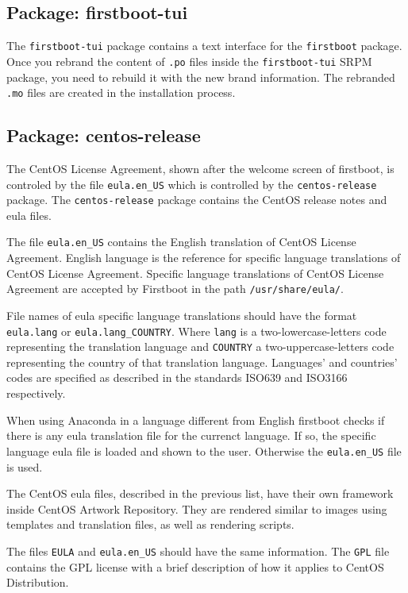 \subsection{Package: firstboot-tui}

The \texttt{firstboot-tui} package contains a text interface for the
\texttt{firstboot} package.  Once you rebrand the content of
\texttt{.po} files inside the \texttt{firstboot-tui} SRPM package, you
need to rebuild it with the new brand information.  The rebranded
\texttt{.mo} files are created in the installation process.

\subsection{Package: centos-release}

The CentOS License Agreement, shown after the welcome screen of
firstboot, is controled by the file \texttt{eula.en\_US} which is
controlled by the \texttt{centos-release} package.  The
\texttt{centos-release} package contains the CentOS release notes and
eula files.

The file \texttt{eula.en\_US} contains the English translation of
CentOS License Agreement. English language is the reference for
specific language translations of CentOS License Agreement. Specific
language translations of CentOS License Agreement are accepted by
Firstboot in the path \texttt{/usr/share/eula/}. 

File names of eula specific language translations should have the
format \texttt{eula.lang} or \texttt{eula.lang\_COUNTRY}.  Where
\texttt{lang} is a two-lowercase-letters code representing the
translation language and \texttt{COUNTRY} a two-uppercase-letters code
representing the country of that translation language. Languages' and
countries' codes are specified as described in the standards ISO639
and ISO3166 respectively.

When using Anaconda in a language different from English firstboot
checks if there is any eula translation file for the currenct
language. If so, the specific language eula file is loaded and shown
to the user.  Otherwise the \texttt{eula.en\_US} file is used.

The CentOS eula files, described in the previous list, have their own
framework inside CentOS Artwork Repository. They are rendered similar
to images using templates and translation files, as well as rendering
scripts. 

The files \texttt{EULA} and \texttt{eula.en\_US} should have the same
information. The \texttt{GPL} file contains the GPL license with a
brief description of how it applies to CentOS Distribution.

